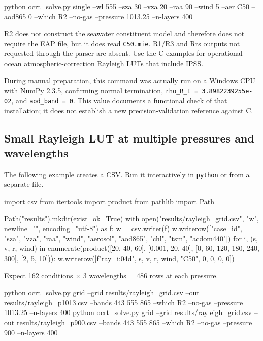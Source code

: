 \begin{ManualCode}
python ocrt_solve.py single --wl 555 --sza 30 --vza 20 --raa 90 --wind 5 --aer C50 --aod865 0 --which R2 --no-gas --pressure 1013.25 --n-layers 400
\end{ManualCode}

R2 does not construct the seawater constituent model and therefore does not require the EAP file, but it does read \texttt{C50.\allowbreak{}mie}. R1/R3 and Rrs outputs not requested through the parser are absent. Use the C examples for operational ocean atmospheric-correction Rayleigh LUTs that include IPSS.

During manual preparation, this command was actually run on a Windows CPU with NumPy 2.3.5, confirming normal termination, \texttt{rho\_\allowbreak{}R\_\allowbreak{}I =\allowbreak{} 3.\allowbreak{}8982239255e-\allowbreak{}02}, and \texttt{aod\_\allowbreak{}band =\allowbreak{} 0}. This value documents a functional check of that installation; it does not establish a new precision-validation reference against C.

\subsection{Small Rayleigh LUT at multiple pressures and wavelengths}
\label{sec:auto:06_python_batch:7.2}
The following example creates a CSV. Run it interactively in \texttt{python} or from a separate file.


\begin{ManualCode}
import csv
from itertools import product
from pathlib import Path

Path("results").mkdir(exist_ok=True)
with open("results/rayleigh_grid.csv", "w", newline="", encoding="utf-8") as f:
    w = csv.writer(f)
    w.writerow(["case_id", "sza", "vza", "raa", "wind", "aerosol", "aod865", "chl", "tsm", "acdom440"])
    for i, (s, v, r, wind) in enumerate(product([20, 40, 60], [0.001, 20, 40], [0, 60, 120, 180, 240, 300], [2, 5, 10])):
        w.writerow([f"ray_{i:04d}", s, v, r, wind, "C50", 0, 0, 0, 0])
\end{ManualCode}

Expect 162 conditions \ensuremath{\times} 3 wavelengths = 486 rows at each pressure.


\begin{ManualCode}
python ocrt_solve.py grid --grid results/rayleigh_grid.csv --out results/rayleigh_p1013.csv --bands 443 555 865 --which R2 --no-gas --pressure 1013.25 --n-layers 400
python ocrt_solve.py grid --grid results/rayleigh_grid.csv --out results/rayleigh_p900.csv --bands 443 555 865 --which R2 --no-gas --pressure 900 --n-layers 400
\end{ManualCode}

